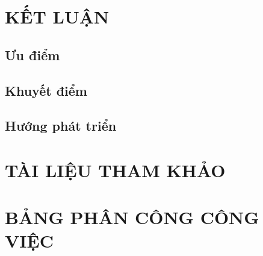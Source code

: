 \documentclass[a4paper]{article}
\begin{document}
\section{KẾT LUẬN}
	\subsection{Ưu điểm}


	\subsection{Khuyết điểm}
	\subsection{Hướng phát triển}

\section{TÀI LIỆU THAM KHẢO}

\section{BẢNG PHÂN CÔNG CÔNG VIỆC}
\end{document}
